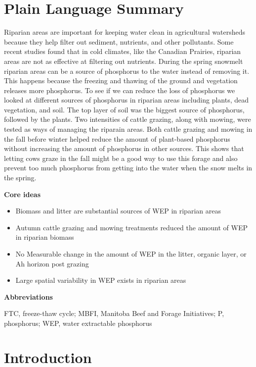 \documentclass[
]{agujournal2019}
\providecommand{\tightlist}{%
  \setlength{\itemsep}{0pt}\setlength{\parskip}{0pt}}\usepackage{longtable,booktabs,array}
\begin{document}
\section*{Plain Language Summary}
Riparian areas are important for keeping water clean in agricultural
watersheds because they help filter out sediment, nutrients, and other
pollutants. Some recent studies found that in cold climates, like the
Canadian Prairies, riparian areas are not as effective at filtering out
nutrients. During the spring snowmelt riparian areas can be a source of
phosphorus to the water instead of removing it. This happens because the
freezing and thawing of the ground and vegetation releases more
phosphorus. To see if we can reduce the loss of phosphorus we looked at
different sources of phosphorus in riparian areas including plants, dead
vegetation, and soil. The top layer of soil was the biggest source of
phosphorus, followed by the plants. Two intensities of cattle grazing,
along with mowing, were tested as ways of managing the riparain areas.
Both cattle grazing and mowing in the fall before winter helped reduce
the amount of plant-based phosphorus without increasing the amount of
phosphorus in other sources. This shows that letting cows graze in the
fall might be a good way to use this forage and also prevent too much
phosphorus from getting into the water when the snow melts in the
spring.



\textbf{Core ideas}

\begin{itemize}
\tightlist
\item
  Biomass and litter are substantial sources of WEP in riparian areas
\item
  Autumn cattle grazing and mowing treatments reduced the amount of WEP
  in riparian biomass
\item
  No Measurable change in the amount of WEP in the litter, organic
  layer, or Ah horizon post grazing
\item
  Large spatial variability in WEP exists in riparian areas
\end{itemize}

\textbf{Abbreviations}

FTC, freeze-thaw cycle; MBFI, Manitoba Beef and Forage Initiatives; P,
phosphorus; WEP, water extractable phosphorus

\section{Introduction}\label{introduction}
\end{document}
